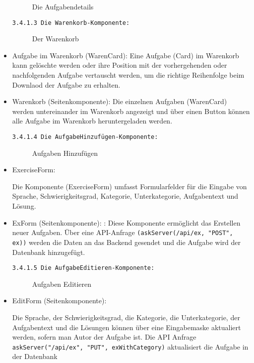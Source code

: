 \begin{itemize}
\begin{figure}[ht]
  \caption{Die Aufgabendetails \cite{fig:aufgabendetails}}
\end{figure}

\texttt{3.4.1.3 Die Warenkorb-Komponente:}
\begin{figure}[ht]
  \caption{Der Warenkorb \cite{fig:warenkorb}}
\end{figure}

\item Aufgabe im Warenkorb (WarenCard):
Eine Aufgabe (Card) im Warenkorb kann gelöschte werden oder ihre Position mit der vorhergehenden oder nachfolgenden Aufgabe vertauscht werden, um die richtige Reihenfolge beim Downlaod der Aufgabe zu erhalten. 


\item Warenkorb (Seitenkomponente):
Die einzelnen Aufgaben (WarenCard) werden untereinander im Warenkorb angezeigt und über einen Button können alle Aufgabe im Warenkorb heruntergeladen werden.



\texttt{3.4.1.4 Die AufgabeHinzufügen-Komponente:}
\begin{figure}[ht]
  \caption{Aufgaben Hinzufügen \cite{fig:hinzufuegen}}
\end{figure}

\item{ExerciseForm}:

Die Komponente (ExerciseForm) umfasst Formularfelder für die Eingabe von Sprache, Schwierigkeitsgrad, Kategorie, Unterkategorie, Aufgabentext und Lösung.

\item ExForm (Seitenkomponente): :
Diese Komponente ermöglicht das Erstellen neuer Aufgaben. Über eine API-Anfrage \texttt{(askServer(/api/ex, "POST", ex))} werden die Daten an das Backend gesendet und die Aufgabe wird der Datenbank hinzugefügt.


\texttt{3.4.1.5 Die AufgabeEditieren-Komponente:}
\begin{figure}[ht]
  \caption{Aufgaben Editieren \cite{fig:editieren}}
\end{figure}

\item{EditForm} (Seitenkomponente):

Die Sprache, der Schwierigkeitsgrad, die Kategorie, die Unterkategorie, der Aufgabentext und die Lösungen können über eine Eingabemaske aktualiert werden, sofern man Autor der Aufgabe ist.
Die API Anfrage \texttt{askServer("/api/ex", "PUT", exWithCategory)} aktualisiert die Aufgabe in der Datenbank



\end{itemize}
